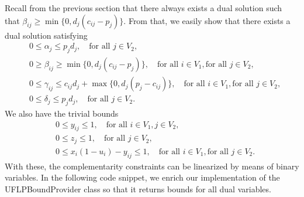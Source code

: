 Recall from the previous section that there always exists a dual solution such
that $\beta_{ij} \ge \min\{ 0, d_j(c_{ij} - p_j) \}$. From that, we easily show that
there exists a dual solution satisfying
\begin{align*}
    & 0 \le \alpha_j \le p_jd_j, \quad \text{for all }j\in V_2, \\
    & 0 \ge \beta_{ij} \ge \min\{ 0, d_j(c_{ij} - p_j) \}, \quad \text{for all } i\in V_1, \text{for all } j\in V_2, \\
    & 0 \le \gamma_{ij} \le c_{ij}d_j + \max\{ 0, d_j( p_j - c_{ij} ) \}, \quad \text{for all } i\in V_1, \text{for all } j\in V_2, \\
    & 0 \le \delta_j \le p_jd_j, \quad \text{for all } j\in V_2.
\end{align*}
We also have the trivial bounds 
\begin{align*}
    & 0\le y_{ij} \le 1, \quad \text{for all } i\in V_1, j\in V_2, \\
    & 0\le z_j \le 1, \quad \text{for all } j\in V_2, \\
    & 0 \le x_i(1 - u_i) - y_{ij} \le 1 , \quad \text{for all } i\in V_1, \text{for all } j\in V_2.
\end{align*}
With these, the complementarity constraints can be linearized by means of
binary variables. In the following code snippet, we enrich our implementation
of the \textsf{UFLPBoundProvider} class so that it returns bounds for all dual
variables.
%
